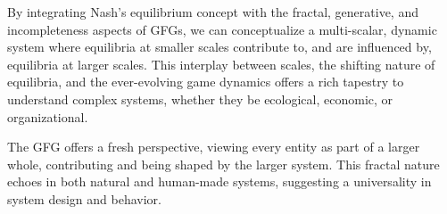 \documentclass[sn-nature]{sn-jnl}%
\theoremstyle{thmstyleone}%
\theoremstyle{thmstyletwo}%
\theoremstyle{thmstylethree}%
\begin{document}
By integrating Nash's equilibrium concept with the fractal, generative, and incompleteness aspects of GFGs, we can conceptualize a multi-scalar, dynamic system where equilibria at smaller scales contribute to, and are influenced by, equilibria at larger scales. This interplay between scales, the shifting nature of equilibria, and the ever-evolving game dynamics offers a rich tapestry to understand complex systems, whether they be ecological, economic, or organizational.

The GFG offers a fresh perspective, viewing every entity as part of a larger whole, contributing and being shaped by the larger system. This fractal nature echoes in both natural and human-made systems, suggesting a universality in system design and behavior\cite{mandelbrot_fractal_1982}.

\noindent %
\end{document}

